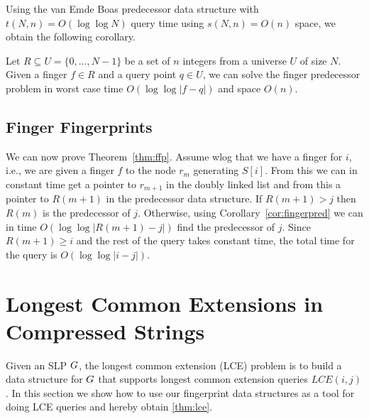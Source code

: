 \noindent Using the %
van Emde Boas predecessor data structure \cite{van1976design, mehlhorn1990bounded, willard1983log} with $t(N, n) = O(\log \log N)$ query time using $s(N, n) = O(n)$ space, we %
obtain the following corollary.

\begin{corollary}\label{cor:fingerpred}
	Let $R \subseteq U = \{ 0, \ldots, N-1 \}$ be a set of $n$ integers from a universe $U$ of size $N$. 
	Given a finger $f \in R$ and a query point $q \in U$, we can solve the finger predecessor problem in worst case time $O(\log \log |f - q|)$ and space $O(n)$.%
\end{corollary}

\subsection{Finger Fingerprints}
We can now prove Theorem~\ref{thm:ffp}. Assume wlog that we have a finger for $i$, i.e., we  are given a finger $f$ to the node $r_m$ generating $S[i]$. From this we can in constant time get a pointer to $r_{m+1}$ in the doubly linked list and from this a pointer to $R(m+1)$ in the predecessor data structure. If $R(m+1) > j$ then $R(m)$ is the predecessor of $j$. Otherwise,  using Corollary~\ref{cor:fingerpred} we can in time $O(\log\log |R(m+1)-j|)$ find the predecessor of $j$. Since $R(m+1) \geq i$ and the rest of the query takes constant time, the total time for the query is $O(\log \log |i-j|)$.




\section{Longest Common Extensions in Compressed Strings}
Given an SLP $G$, the longest common extension (LCE) problem is to build a data structure for $G$ that supports longest common extension queries $LCE(i,j)$. In this section we show how to use our fingerprint data structures as a tool for doing LCE queries and hereby obtain \autoref{thm:lce}.


